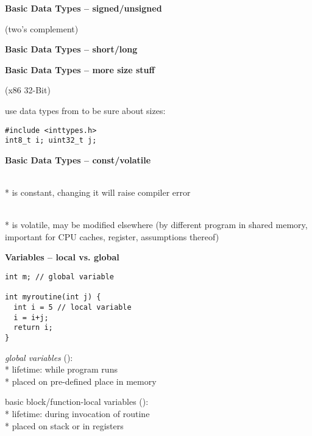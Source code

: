 \textbf{Basic Data Types -- signed/unsigned}
\begin{items}
  \item {} (two's complement)
  \item {}
\end{items}

\textbf{Basic Data Types -- short/long}
\begin{items}
  \item {}
  \item {}
\end{items}

\textbf{Basic Data Types -- more size stuff}
\begin{items}
  \item {} (x86 32-Bit)
  \item use data types from  to be sure about sizes:
  \begin{lstlisting}[style=customc]
#include <inttypes.h>
int8_t i; uint32_t j;
  \end{lstlisting}
\end{items}

\textbf{Basic Data Types -- const/volatile}
\begin{items}
  \item {} \\*
     is constant, changing it will raise compiler error
  \item {} \\*
     is volatile, may be modified elsewhere (by different program in shared memory, important for CPU caches, register, assumptions thereof)
\end{items}

\newpage

\textbf{Variables -- local vs. global}
\begin{lstlisting}[style=customc]
int m; // global variable

int myroutine(int j) {
  int i = 5 // local variable
  i = i+j;
  return i;
}
\end{lstlisting}
\begin{items}
  \item \emph{global variables} (): \\*
    lifetime: while program runs \\*
    placed on pre-defined place in memory
  \item basic block/function-local variables (): \\*
    lifetime: during invocation of routine \\*
    placed on stack or in registers
\end{items}

